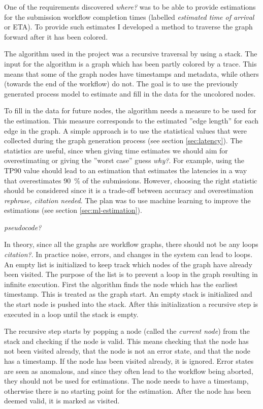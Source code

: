 \documentclass[english,12pt,a4paper,pdftex,sci,utf8]{aaltothesis}
\theoremstyle{definition}
\newcommand{\nyi}[1]{\noindent\colorbox{nyibg}{\textcolor{nyitext}{\emph{#1}}}}
\begin{document}
One of the requirements discovered \nyi{where?} was to be able to provide estimations for the submission workflow completion times (labelled \emph{estimated time of arrival} or ETA). 
To provide such estimates I developed a method to traverse the graph forward after it has been colored.

The algorithm used in the project was a recursive traversal by using a stack.
The input for the algorithm is a graph which has been partly colored by a trace.
This means that some of the graph nodes have timestamps and metadata, while others (towards the end of the workflow) do not.
The goal is to use the previously generated process model to estimate
and fill in the data for the uncolored nodes.

To fill in the data for future nodes, the algorithm needs a measure to be used for the estimation. 
This measure corresponds to the estimated ''edge length'' for each edge in the graph.
A simple approach is to use the statistical values that were collected during the graph generation process (see section \ref{sec:latency}).
The statistics are useful, since when giving time estimates we should aim for overestimating or giving the ''worst case'' guess \nyi{why?}.
For example, using the TP90 value should lead to an estimation that estimates the latencies in a way that overestimates 90~\% of the submissions.
However, choosing the right statistic should be considered since it is a trade-off between accuracy and overestimation \nyi{rephrase, citation needed}.
The plan was to use machine learning to improve the estimations (see section \ref{sec:ml-estimation}).

\nyi{pseudocode?}

In theory, since all the graphs are workflow graphs, there should not be any loops \nyi{citation?}. 
In practice noise, errors, and changes in the system can lead to loops.
An empty list is initialized to keep track which nodes of the graph have already been visited.
The purpose of the list is to prevent a loop in the graph resulting in infinite execution.
First the algorithm finds the node which has the earliest timestamp.
This is treated as the graph start.
An empty stack is initialized and the start node is pushed into the stack.
After this initialization a recursive step is executed in a loop until the stack is empty.

The recursive step starts by popping a node (called the \emph{current node}) from the stack and checking if the node is valid.
This means checking that the node has not been visited already, that the node is not an error state, and that the node has a timestamp.
If the node has been visited already, it is ignored.
Error states are seen as anomalous, and since they often lead to the workflow being aborted, they should not be used for estimations.
The node needs to have a timestamp, otherwise there is no starting point for the estimation.
After the node has been deemed valid, it is marked as visited.
\end{document}
